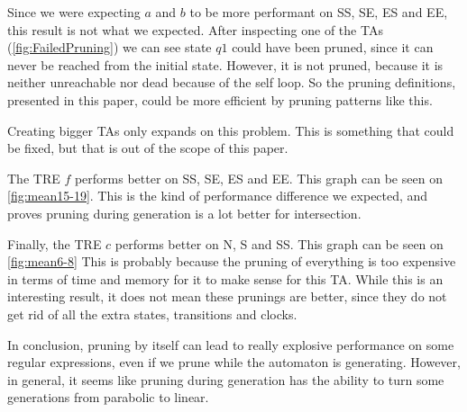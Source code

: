 \resizebox{\columnwidth}{!}{
    
}

\resizebox{\columnwidth}{!}{
    
}
\label{fig:mean3-5}

Since we were expecting $a$ and $b$ to be more performant on SS, SE, ES and EE, this result is not what we expected.
After inspecting one of the TAs (\cref{fig:FailedPruning}) we can see state $q1$ could have been pruned, since it can never be reached from the initial state.
However, it is not pruned, because it is neither unreachable nor dead because of the self loop.
So the pruning definitions, presented in this paper, could be more efficient by pruning patterns like this.


\label{fig:FailedPruning}

Creating bigger TAs only expands on this problem. This is something that could be fixed, but that is out of the scope of this paper.

The TRE $f$ performs better on SS, SE, ES and EE.
This graph can be seen on \cref{fig:mean15-19}.
This is the kind of performance difference we expected, and proves pruning during generation is a lot better for intersection.

\resizebox{\columnwidth}{!}{
    
}

\resizebox{\columnwidth}{!}{
    
}
\label{fig:mean15-19}

Finally, the TRE $c$ performs better on N, S and SS.
This graph can be seen on \cref{fig:mean6-8}
This is probably because the pruning of everything is too expensive in terms of time and memory for it to make sense for this TA.
While this is an interesting result, it does not mean these prunings are better, since they do not get rid of all the extra states, transitions and clocks.

\resizebox{\columnwidth}{!}{
    
}

\resizebox{\columnwidth}{!}{
    
}
\label{fig:mean6-8}

In conclusion, pruning by itself can lead to really explosive performance on some regular expressions, even if we prune while the automaton is generating.
However, in general, it seems like pruning during generation has the ability to turn some generations from parabolic to linear.
